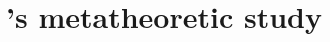 \documentclass{article}
\title{\Russell's metatheoretic study}
\date{}
\begin{document}
\maketitle
\abstract

\myabstract
\end{document}
